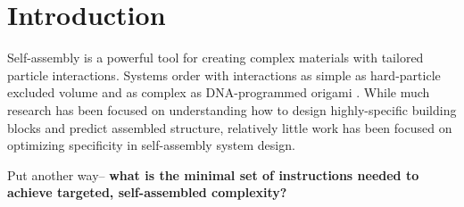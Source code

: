\section{Introduction}

Self-assembly is a powerful tool for creating complex materials with tailored particle interactions.
Systems order with interactions as simple as hard-particle excluded volume \cite{Damasceno_2012_Science} and as complex as DNA-programmed origami \cite{Winfree_1998_Nature}. 
While much research has been focused on understanding how to design highly-specific building blocks and predict assembled structure, relatively little work has been focused on optimizing specificity in self-assembly system design.

Put another way-- 
\textbf{what is the minimal set of instructions needed to achieve targeted, self-assembled complexity?}

%

%


